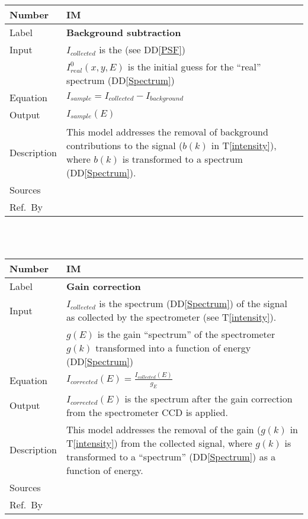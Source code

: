\documentclass[12pt]{article}
\newcommand{\colAwidth}{0.13\textwidth}
\newcommand{\colBwidth}{0.82\textwidth}
\newcommand{\ddref}[1]{DD\ref{#1}}
\newcommand{\tref}[1]{T\ref{#1}}
\newcounter{instnum} %
\begin{document}
\noindent
\begin{minipage}{\textwidth}
	\renewcommand*{\arraystretch}{1.5}
	\begin{tabular}{| p{\colAwidth} | p{\colBwidth}|}
		\hline
		\rowcolor[gray]{0.9}
		Number& IM{instnum}\theinstnum \label{background}\\
		\hline
		Label& \bf Background subtraction\\
		\hline
		Input & $I_{collected}$ is the  (see \ddref{PSF})\\
		& $I_{real}^0(x,y,E)$ is the initial guess for the ``real'' spectrum (\ddref{Spectrum})\\
		\hline
		Equation & $I_{sample}=I_{collected}-I_{background}$\\
		\hline
		Output& $I_{sample}(E)$\\
		\hline
		Description & This model addresses the removal of background contributions to the signal ($b(k)$ in \tref{intensity}), where $b(k)$ is transformed to a spectrum (\ddref{Spectrum}).\\
		\hline
		Sources & \\
		\hline
		Ref.\ By & \\
		\hline
	\end{tabular}
\end{minipage}\\

~\newline


\noindent
\begin{minipage}{\textwidth}
	\renewcommand*{\arraystretch}{1.5}
	\begin{tabular}{| p{\colAwidth} | p{\colBwidth}|}
		\hline
		\rowcolor[gray]{0.9}
		Number& IM{instnum}\theinstnum \label{gain}\\
		\hline
		Label& \bf Gain correction\\
		\hline
		Input & $I_{collected}$ is the spectrum (\ddref{Spectrum}) of the signal as collected by the spectrometer (see \tref{intensity}).\\
		& $g(E)$ is the gain ``spectrum'' of the spectrometer $g(k)$ transformed into a function of energy (\ddref{Spectrum})\\
		\hline
		Equation & $I_{corrected}(E)=\frac{I_{collected}(E)}{g_{E}}$\\
		\hline
		Output& $I_{corrected}(E)$ is the spectrum after the gain correction from the spectrometer CCD is applied.\\
		\hline
		Description & This model addresses the removal of the gain ($g(k)$ in \tref{intensity}) from the collected signal, where $g(k)$ is transformed to a ``spectrum'' (\ddref{Spectrum}) as a function of energy.\\
		\hline
		Sources & \\
		\hline
		Ref.\ By & \\
		\hline
	\end{tabular}
\end{minipage}\\
\end{document}
